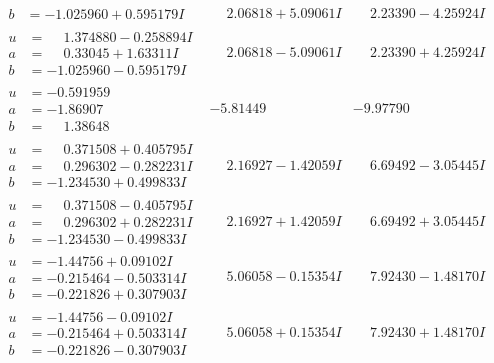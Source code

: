 \documentclass[1p]{elsarticle_modified}
\theoremstyle{definition}
\begin{document}
$$\begin{array}{c|c|c}
\begin{aligned}
b &= -1.025960 + 0.595179 I\end{aligned}
 & \phantom{-}2.06818 + 5.09061 I & \phantom{-}2.23390 - 4.25924 I \\ \hline\begin{aligned}
u &= \phantom{-}1.374880 - 0.258894 I \\
a &= \phantom{-}0.33045 + 1.63311 I \\
b &= -1.025960 - 0.595179 I\end{aligned}
 & \phantom{-}2.06818 - 5.09061 I & \phantom{-}2.23390 + 4.25924 I \\ \hline\begin{aligned}
u &= -0.591959\phantom{ +0.000000I} \\
a &= -1.86907\phantom{ +0.000000I} \\
b &= \phantom{-}1.38648\phantom{ +0.000000I}\end{aligned}
 & -5.81449\phantom{ +0.000000I} & -9.97790\phantom{ +0.000000I} \\ \hline\begin{aligned}
u &= \phantom{-}0.371508 + 0.405795 I \\
a &= \phantom{-}0.296302 - 0.282231 I \\
b &= -1.234530 + 0.499833 I\end{aligned}
 & \phantom{-}2.16927 - 1.42059 I & \phantom{-}6.69492 - 3.05445 I \\ \hline\begin{aligned}
u &= \phantom{-}0.371508 - 0.405795 I \\
a &= \phantom{-}0.296302 + 0.282231 I \\
b &= -1.234530 - 0.499833 I\end{aligned}
 & \phantom{-}2.16927 + 1.42059 I & \phantom{-}6.69492 + 3.05445 I \\ \hline\begin{aligned}
u &= -1.44756 + 0.09102 I \\
a &= -0.215464 - 0.503314 I \\
b &= -0.221826 + 0.307903 I\end{aligned}
 & \phantom{-}5.06058 - 0.15354 I & \phantom{-}7.92430 - 1.48170 I \\ \hline\begin{aligned}
u &= -1.44756 - 0.09102 I \\
a &= -0.215464 + 0.503314 I \\
b &= -0.221826 - 0.307903 I\end{aligned}
 & \phantom{-}5.06058 + 0.15354 I & \phantom{-}7.92430 + 1.48170 I \\ \hline\begin{aligned}

\end{aligned}
\end{array}$$
\end{document}
